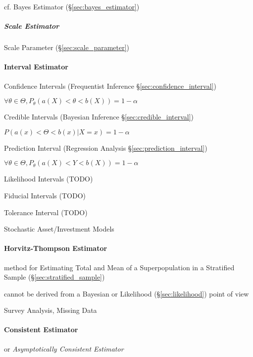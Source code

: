 cf. Bayes Estimator (\S\ref{sec:bayes_estimator})



\subparagraph{Scale Estimator}\label{sec:scale_estimator}

Scale Parameter (\S\ref{sec:scale_parameter})



\paragraph{Interval Estimator}\label{sec:interval_estimator}\hfill

Confidence Intervals (Frequentist Inference \S\ref{sec:confidence_interval})

$\forall \theta \in \Theta, P_\theta(a(X) < \theta < b(X)) = 1 - \alpha$

Credible Intervals (Bayesian Inference \S\ref{sec:credible_interval})

$P(a(x) < \Theta < b(x) | X = x) = 1 - \alpha$

Prediction Interval (Regression Analysis \S\ref{sec:prediction_interval})

$\forall \theta \in \Theta, P_\theta(a(X) < Y < b(X)) = 1 - \alpha$

Likelihood Intervals (TODO)

Fiducial Intervals (TODO)

Tolerance Interval (TODO)

Stochastic Asset/Investment Models



\paragraph{Horvitz-Thompson Estimator}\label{sec:horvitz_thompson}\hfill

method for Estimating Total and Mean of a Superpopulation in a Stratified Sample
(\S\ref{sec:stratified_sample})

cannot be derived from a Bayesian or Likelihood (\S\ref{sec:likelihood}) point
of view

Survey Analysis, Missing Data



\paragraph{Consistent Estimator}\label{sec:consistent_estimator}\hfill

or \emph{Asymptotically Consistent Estimator}


